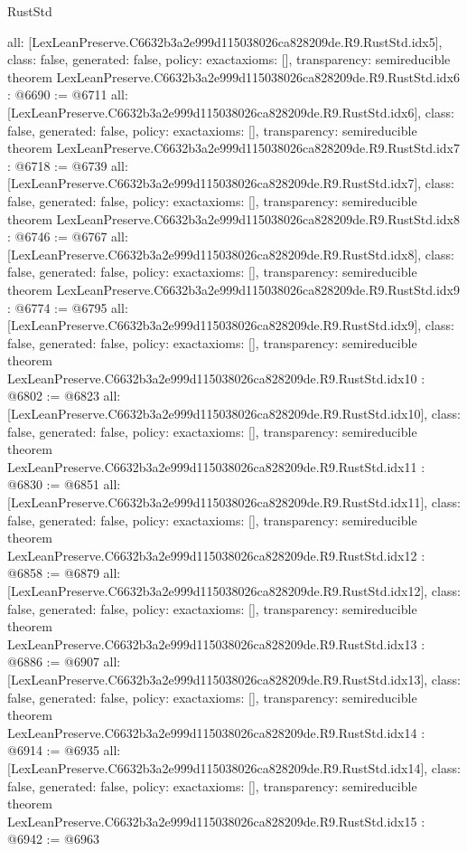 \begin{lexlean}{RustStd}
\begin{coremodule}
{  all: [LexLeanPreserve.C6632b3a2e999d115038026ca828209de.R9.RustStd.idx5],
  class: false,
  generated: false,
  policy: exact{axioms: []},
  transparency: semireducible
}
theorem LexLeanPreserve.C6632b3a2e999d115038026ca828209de.R9.RustStd.idx6 : @6690 := @6711 {
  all: [LexLeanPreserve.C6632b3a2e999d115038026ca828209de.R9.RustStd.idx6],
  class: false,
  generated: false,
  policy: exact{axioms: []},
  transparency: semireducible
}
theorem LexLeanPreserve.C6632b3a2e999d115038026ca828209de.R9.RustStd.idx7 : @6718 := @6739 {
  all: [LexLeanPreserve.C6632b3a2e999d115038026ca828209de.R9.RustStd.idx7],
  class: false,
  generated: false,
  policy: exact{axioms: []},
  transparency: semireducible
}
theorem LexLeanPreserve.C6632b3a2e999d115038026ca828209de.R9.RustStd.idx8 : @6746 := @6767 {
  all: [LexLeanPreserve.C6632b3a2e999d115038026ca828209de.R9.RustStd.idx8],
  class: false,
  generated: false,
  policy: exact{axioms: []},
  transparency: semireducible
}
theorem LexLeanPreserve.C6632b3a2e999d115038026ca828209de.R9.RustStd.idx9 : @6774 := @6795 {
  all: [LexLeanPreserve.C6632b3a2e999d115038026ca828209de.R9.RustStd.idx9],
  class: false,
  generated: false,
  policy: exact{axioms: []},
  transparency: semireducible
}
theorem LexLeanPreserve.C6632b3a2e999d115038026ca828209de.R9.RustStd.idx10 : @6802 := @6823 {
  all: [LexLeanPreserve.C6632b3a2e999d115038026ca828209de.R9.RustStd.idx10],
  class: false,
  generated: false,
  policy: exact{axioms: []},
  transparency: semireducible
}
theorem LexLeanPreserve.C6632b3a2e999d115038026ca828209de.R9.RustStd.idx11 : @6830 := @6851 {
  all: [LexLeanPreserve.C6632b3a2e999d115038026ca828209de.R9.RustStd.idx11],
  class: false,
  generated: false,
  policy: exact{axioms: []},
  transparency: semireducible
}
theorem LexLeanPreserve.C6632b3a2e999d115038026ca828209de.R9.RustStd.idx12 : @6858 := @6879 {
  all: [LexLeanPreserve.C6632b3a2e999d115038026ca828209de.R9.RustStd.idx12],
  class: false,
  generated: false,
  policy: exact{axioms: []},
  transparency: semireducible
}
theorem LexLeanPreserve.C6632b3a2e999d115038026ca828209de.R9.RustStd.idx13 : @6886 := @6907 {
  all: [LexLeanPreserve.C6632b3a2e999d115038026ca828209de.R9.RustStd.idx13],
  class: false,
  generated: false,
  policy: exact{axioms: []},
  transparency: semireducible
}
theorem LexLeanPreserve.C6632b3a2e999d115038026ca828209de.R9.RustStd.idx14 : @6914 := @6935 {
  all: [LexLeanPreserve.C6632b3a2e999d115038026ca828209de.R9.RustStd.idx14],
  class: false,
  generated: false,
  policy: exact{axioms: []},
  transparency: semireducible
}
theorem LexLeanPreserve.C6632b3a2e999d115038026ca828209de.R9.RustStd.idx15 : @6942 := @6963 {
}
\end{coremodule}
\end{lexlean}
